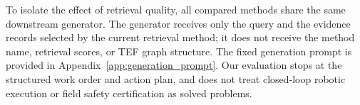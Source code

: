 To isolate the effect of retrieval quality, all compared methods share the same downstream generator. The generator receives only the query and the evidence records selected by the current retrieval method; it does not receive the method name, retrieval scores, or TEF graph structure. The fixed generation prompt is provided in Appendix~\ref{app:generation_prompt}. Our evaluation stops at the structured work order and action plan, and does not treat closed-loop robotic execution or field safety certification as solved problems.
